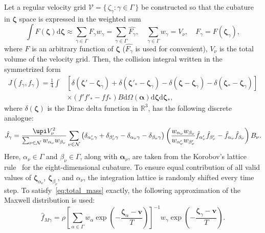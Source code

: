 \documentclass[final]{jfm} %
\newcommand{\dd}{\mathrm{d}}
\newcommand{\dzeta}{\boldsymbol{\dd\zeta}}
\newcommand{\bzeta}{\boldsymbol{\zeta}}
\newcommand{\Nu}{\mathcal{N}}
\newcommand{\Set}[2]{\{\,{#1}:{#2}\,\}}
\begin{document}
Let a regular velocity grid \(\mathcal{V} = \Set{\zeta_\gamma}{\gamma\in\Gamma}\) be constructed so that
the cubature in \(\bzeta\) space is expressed in the weighted sum
\begin{equation}\label{eq:zeta_cubature}
    \int F(\bzeta) \dzeta \approx \sum_{\gamma\in\Gamma} F_\gamma w_\gamma
        = \sum_{\gamma\in\Gamma} \hat{F_\gamma},
        \quad \sum_{\gamma\in\Gamma} w_\gamma = V_\nu,
        \quad F_\gamma = F(\bzeta_\gamma),
\end{equation}
where \(F\) is an arbitrary function of \(\bzeta\) (\(\hat{F_\gamma}\) is used for convenient),
\(V_\nu\) is the total volume of the velocity grid.
Then, the collision integral written in the symmetrized form
\begin{equation}\label{eq:symm_ci}
    \begin{aligned}
    J(f_\gamma, f_\gamma) = \frac14\int &\left[
        \delta(\bzeta'-\bzeta_\gamma) + \delta(\bzeta'_*-\bzeta_\gamma)
        - \delta(\bzeta-\bzeta_\gamma) - \delta(\bzeta_*-\bzeta_\gamma)\right] \\
        &\times(f'f'_* - ff_*)B \dd\Omega(\boldsymbol{\alpha}) \dzeta\dzeta_*,
    \end{aligned}
\end{equation}
where \(\delta(\bzeta)\) is the Dirac delta function in \(\mathbb{R}^3\),
has the following discrete analogue:
\begin{equation}\label{eq:discrete_symm_ci}
    \hat{J_\gamma} = \frac{\upi V_\nu^2}{\sum_{\nu\in\Nu} w_{\alpha_\nu}w_{\beta_\nu}}
        \sum_{\nu\in\Nu} \left(
            \delta_{\alpha'_\nu\gamma} + \delta_{\beta'_\nu\gamma}
            - \delta_{\alpha_\nu\gamma} - \delta_{\beta_\nu\gamma}
        \right)\left(
            \frac{w_{\alpha_\nu}w_{\beta_\nu}}{w_{\alpha'_\nu}w_{\beta'_\nu}}
            \hat{f}_{\alpha'_\nu}\hat{f}_{\beta'_\nu} - \hat{f}_{\alpha_\nu}\hat{f}_{\beta_\nu}
        \right)B_\nu.
\end{equation}
Here, \(\alpha_\nu\in\Gamma\) and \(\beta_\nu\in\Gamma\), along with \(\boldsymbol{\alpha}_\nu\),
are taken from the Korobov's lattice rule~\citep{Korobov1959, Sloan1994}
for the eight-dimensional cubature.
To ensure equal contribution of all valid values of
\(\bzeta_{\alpha_\nu}\), \(\bzeta_{\beta_\nu}\), and \(\alpha_\nu\),
the integration lattice is randomly shifted every time step.
To satisfy~\eqref{eq:total_mass} exactly, the following approximation of the Maxwell distribution is used:
\begin{equation}\label{eq:discrete_Maxwell}
    \hat{f}_{M\gamma} = \rho\left[\sum_{\alpha\in\Gamma}w_\alpha\exp
            \left(-\frac{\bzeta_\alpha - \boldsymbol{v}}{T}\right)
        \right]^{-1}
        w_\gamma\exp\left(-\frac{\bzeta_\gamma - \boldsymbol{v}}{T}\right).
\end{equation}
\end{document}
